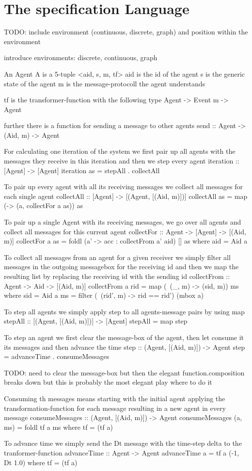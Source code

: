\section{The specification Language}

TODO: include environment (continuous, discrete, graph) and position within the environment

introduce environments: discrete, continuous, graph

An Agent A is a 5-tuple <aid, s, m, tf>
aid is the id of the agent
s is the generic state of the agent
m is the message-protocoll the agent understands 


tf is the transformer-function with the following type Agent -> Event m -> Agent



further there is a function for sending a message to other agents
send :: Agent -> (Aid, m) -> Agent

For calculating one iteration of the system we first pair up all agents with the messages they receive in this iteration and then we step every agent
iteration :: [Agent] -> [Agent]
iteration as = stepAll . collectAll

To pair up every agent with all its receiving messages we collect all messages for each single agent
collectAll :: [Agent] -> [(Agent, [(Aid, m)])]
collectAll as = map (\a -> (a, collectFor a as)) as

To pair up a single Agent with its receiving messages, we go over all agents and collect all messages for this current agent
collectFor :: Agent -> [Agent] -> [(Aid, m)]
collectFor a as = foldl (\acc a' -> acc : collectFrom a' aid) [] as
	where
		aid = Aid a

To collect all messages from an agent for a given receiver we simply filter all messages in the outgoing messagebox for the receiving id and then we map the resulting list by replacing the receiving id with the sending id
collectFrom :: Agent -> Aid -> [(Aid, m)]
collectFrom a rid = map (\ (_, m) -> (sid, m)) ms
	where
		sid = Aid a
		ms = filter (\ (rid', m) -> rid == rid') (mbox a)

To step all agents we simply apply step to all agents-message pairs by using map
stepAll :: [(Agent, [(Aid, m)])] -> [Agent]
stepAll = map step

To step an agent we first clear the message-box of the agent, then let consume it its messages and then advance the time 
step :: (Agent, [(Aid, m)]) -> Agent
step = advanceTime . consumeMessages 

TODO: need to clear the message-box but then the elegant function.composition breaks down but this is probably the most elegant play where to do it

Consuming th messages means starting with the initial agent applying the transformation-function for each message resulting in a new agent in every message
consumeMessages :: (Agent, [(Aid, m)]) -> Agent
consumeMessages (a, ms) = foldl tf a ms
	where
		tf = (tf a)

To advance time we simply send the Dt message with the time-step delta to the tranformer-function
advanceTime :: Agent -> Agent
advanceTime a = tf a (-1, Dt 1.0)
	where
		tf = (tf a)
